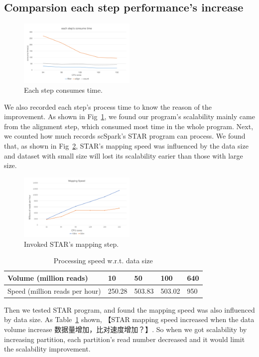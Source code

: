 \documentclass[conference]{IEEEtran}
\begin{document}
\subsection{Comparsion each step performance's increase}
\begin{figure}
  \includegraphics[width=0.5\textwidth]{fig5.pdf}
  \caption{Each step consumes time.} \label{fig5}
\end{figure}
We also recorded each step's process time to know the reason of the improvement.
As shown in Fig~\ref{fig5}, we found our program's scalability mainly came from the alignment step, which consumed most time in the whole program.
Next, we counted how much records scSpark's STAR program can process.
We found that, as shown in Fig~\ref{fig6}, STAR's mapping speed was influenced by the data size and dataset with small size will lost its scalability earier than those with large size.
\begin{figure}
  \includegraphics[width=0.5\textwidth]{fig6.pdf}
  \caption{Invoked STAR's mapping step.} \label{fig6}
\end{figure}

\begin{table}
    \centering
    \caption{Processing speed w.r.t. data size}\label{tab3}
    \begin{tabular}{|l | l | l | l | l|}
    \hline
    Volume (million reads) & 10 & 50 & 100 & 640 \\
    \hline
    Speed (million reads per hour) & 250.28 & 503.83 & 503.02 & 950 \\
    \hline
    \end{tabular}
  \end{table}
  
  Then we tested STAR program, and found the mapping speed was also influenced by data size. 
  As Table~\ref{tab3} shown, 【STAR mapping speed increased when the data volume increase 数据量增加，比对速度增加？】. 
  So when we got scalability by increasing partition, each partition's read number decreased and it would limit the scalability improvement. 
  
\end{document}
